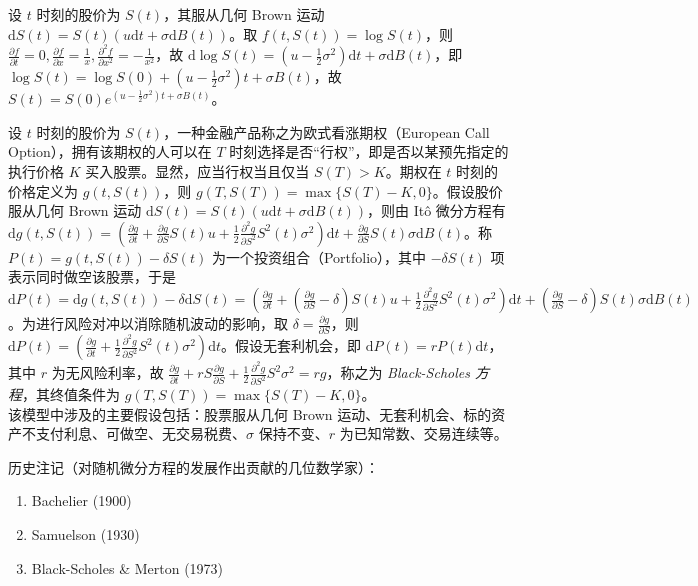 \documentclass[../main.tex]{subfiles}
\begin{document}
\begin{example}
    设 $t$ 时刻的股价为 $S(t)$，其服从几何 Brown 运动 $\mathrm dS(t)=S(t)(u\mathrm dt+\sigma\mathrm dB(t))$。取 $f(t,S(t))=\log S(t)$，则 $\frac{\partial f}{\partial t}=0,\frac{\partial f}{\partial x}=\frac1x,\frac{\partial^2f}{\partial x^2}=-\frac1{x^2}$，故 $\mathrm d\log S(t)=\left(u-\frac12\sigma^2\right)\mathrm dt+\sigma\mathrm dB(t)$，即 $\log S(t)=\log S(0)+\left(u-\frac12\sigma^2\right)t+\sigma B(t)$，故 $S(t)=S(0)e^{\left(u-\frac12\sigma^2\right)t+\sigma B(t)}$。
\end{example}

\begin{example}
    设 $t$ 时刻的股价为 $S(t)$，一种金融产品称之为欧式看涨期权（European Call Option），拥有该期权的人可以在 $T$ 时刻选择是否“行权”，即是否以某预先指定的执行价格 $K$ 买入股票。显然，应当行权当且仅当 $S(T)>K$。期权在 $t$ 时刻的价格定义为 $g(t,S(t))$，则 $g(T,S(T))=\max\{S(T)-K,0\}$。假设股价服从几何 Brown 运动 $\mathrm dS(t)=S(t)(u\mathrm dt+\sigma\mathrm dB(t))$，则由 It\^o 微分方程有 $\mathrm dg(t,S(t))=\left(\frac{\partial g}{\partial t}+\frac{\partial g}{\partial S}S(t)u+\frac12\frac{\partial^2g}{\partial S^2}S^2(t)\sigma^2\right)\mathrm dt+\frac{\partial g}{\partial S}S(t)\sigma\mathrm dB(t)$。称 $P(t)=g(t,S(t))-\delta S(t)$ 为一个投资组合（Portfolio），其中 $-\delta S(t)$ 项表示同时做空该股票，于是 $\mathrm dP(t)=\mathrm dg(t,S(t))-\delta\mathrm dS(t)=\left(\frac{\partial g}{\partial t}+\left(\frac{\partial g}{\partial S}-\delta\right)S(t)u+\frac12\frac{\partial^2g}{\partial S^2}S^2(t)\sigma^2\right)\mathrm dt+\left(\frac{\partial g}{\partial S}-\delta\right)S(t)\sigma\mathrm dB(t)$。为进行风险对冲以消除随机波动的影响，取 $\delta=\frac{\partial g}{\partial S}$，则 $\mathrm dP(t)=\left(\frac{\partial g}{\partial t}+\frac12\frac{\partial^2g}{\partial S^2}S^2(t)\sigma^2\right)\mathrm dt$。假设无套利机会，即 $\mathrm dP(t)=rP(t)\mathrm dt$，其中 $r$ 为无风险利率，故 $\frac{\partial g}{\partial t}+rS\frac{\partial g}{\partial S}+\frac12\frac{\partial^2g}{\partial S^2}S^2\sigma^2=rg$，称之为 \emph{Black-Scholes 方程}，其终值条件为 $g(T,S(T))=\max\{S(T)-K,0\}$。\\
    该模型中涉及的主要假设包括：股票服从几何 Brown 运动、无套利机会、标的资产不支付利息、可做空、无交易税费、$\sigma$ 保持不变、$r$ 为已知常数、交易连续等。
\end{example}

历史注记（对随机微分方程的发展作出贡献的几位数学家）：
\begin{enumerate}
    \item Bachelier (1900)
    \item Samuelson (1930)
    \item Black-Scholes \& Merton (1973)
\end{enumerate}
\end{document}
